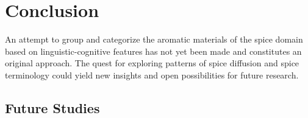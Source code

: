 \chapter*{Conclusion}
\label{ch:conclusion}






An attempt to group and categorize the aromatic materials of the spice domain based on linguistic-cognitive features has not yet been made and constitutes an original approach. The quest for exploring patterns of spice diffusion and spice terminology could yield new insights and open possibilities for future research.




\section{Future Studies}
\label{sec:future_study}